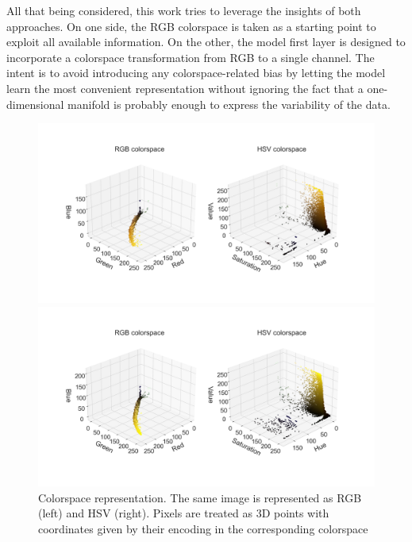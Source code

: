 All that being considered, this work tries to leverage the insights of both approaches. 
On one side, the RGB colorspace is taken as a starting point to exploit all available information. On the other, the model first layer is designed to incorporate a colorspace transformation from RGB to a single channel.
The intent is to avoid introducing any colorspace-related bias by letting the model learn the most convenient representation without ignoring the fact that a one-dimensional manifold is probably enough to express the variability of the data.
\begin{figure}
    \centering
    \includegraphics[width=1.1\textwidth]{figures/120_dataset/colorspace_Mar23bS1C2R3_VLPAGl_200x_y.png}
    
    \centering
    \includegraphics[width=1.1\textwidth]{figures/120_dataset/colorspace_Mar26bS2C1R2_DMl_200x_y.png}
    \caption{Colorspace representation. The same image is represented as RGB (left) and HSV (right). Pixels are treated as 3D points with coordinates given by their encoding in the corresponding colorspace}
    \label{fig:dataset:colorspace}
\end{figure}

